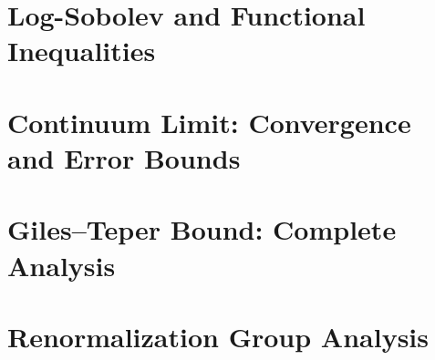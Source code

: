 \documentclass[11pt,a4paper]{report}
\begin{document}
\chapter{Log-Sobolev and Functional Inequalities}
\label{ch:log-sobolev}





\chapter{Continuum Limit: Convergence and Error Bounds}
\label{ch:continuum-appendix}







\chapter{Giles--Teper Bound: Complete Analysis}
\label{ch:giles-teper}




\chapter{Renormalization Group Analysis}
\label{ch:rg-analysis}




\end{document}
